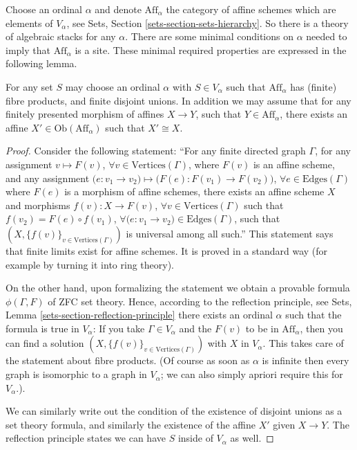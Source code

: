 \noindent
Choose an ordinal $\alpha$ and denote $\text{Aff}_\alpha$ the
category of affine schemes which are elements of $V_\alpha$, see
Sets, Section \ref{sets-section-sets-hierarchy}. So there is a
theory of algebraic stacks for any $\alpha$. There are some minimal
conditions on $\alpha$ needed to imply that $\text{Aff}_\alpha$ is a site. 
These minimal required properties are expressed in the following lemma.

\begin{lemma}
\label{lemma-Aff-site}
For any set $S$ may choose an ordinal $\alpha$ with $S \in V_\alpha$ 
such that $\text{Aff}_\alpha$ has (finite) fibre products, and finite disjoint
unions. In addition we may assume that for any finitely presented morphism
of affines $X \to Y$, such that $Y \in \text{Aff}_\alpha$, there exists
an affine $X' \in \text{Ob}(\text{Aff}_\alpha)$ such that $X' \cong X$.
\end{lemma}

\begin{proof}
Consider the following statement: ``For any finite directed graph $\Gamma$,
for any assignment $v \mapsto F(v)$, $\forall v\in \text{Vertices}(\Gamma)$,
where $F(v)$ is an affine scheme, and any assignment
$\big(e : v_1 \to v_2\big) \mapsto \big(F(e) : F(v_1) \to F(v_2)\big)$,
$\forall e \in \text{Edges}(\Gamma)$ where $F(e)$ is a morphism of affine
schemes, there exists an affine scheme $X$ and morphisms $f(v) : X \to F(v)$,
$\forall v\in \text{Vertices}(\Gamma)$ such that $f(v_2) = F(e) \circ f(v_1)$,
$\forall \big(e : v_1 \to v_2\big) \in \text{Edges}(\Gamma)$, such that
$(X, \{f(v)\}_{v\in \text{Vertices}(\Gamma)})$ is universal among all such.''
This statement says that finite limits exist for affine schemes. It is
proved in a standard way (for example by turning it into ring theory).

\smallskip\noindent
On the other hand, upon formalizing the statement we obtain a provable
formula $\phi(\Gamma, F)$ of ZFC set theory. Hence, according to the reflection
principle, see Sets, Lemma \ref{sets-section-reflection-principle}
there exists an ordinal $\alpha$ such that the formula is true in
$V_\alpha$: If you take $\Gamma \in V_\alpha$ and the $F(v)$ to be in
$\text{Aff}_\alpha$, then you can find a solution
$(X, \{f(v)\}_{v\in \text{Vertices}(\Gamma)})$
with $X$ in $V_\alpha$. This takes care of the statement about fibre 
products. (Of course as soon as $\alpha$ is infinite then every
graph is isomorphic to a graph in $V_\alpha$; we can also simply apriori
require this for $V_\alpha$.).

\smallskip\noindent
We can similarly write out the condition of the existence of disjoint unions
as a set theory formula, and similarly the existence of the affine $X'$
given $X \to Y$. The reflection principle states we can have $S$ inside of
$V_\alpha$ as well.
\end{proof}

